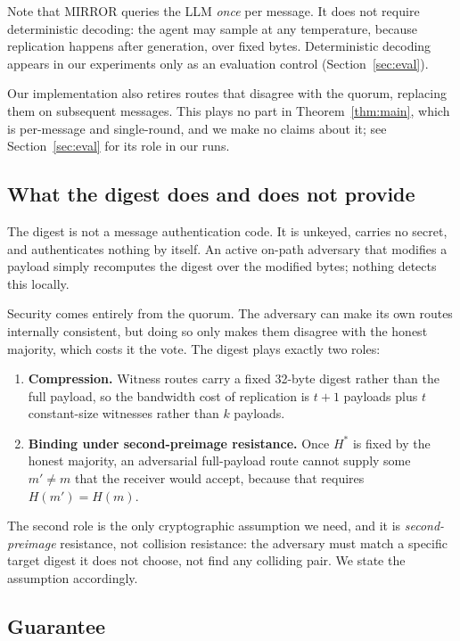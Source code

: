 \documentclass{article}
\begin{document}
Note that MIRROR queries the LLM \emph{once} per message. It does not require deterministic decoding: the agent may sample at any temperature, because replication happens after generation, over fixed bytes. Deterministic decoding appears in our experiments only as an evaluation control (Section~\ref{sec:eval}).

Our implementation also retires routes that disagree with the quorum, replacing them on subsequent messages. This plays no part in Theorem~\ref{thm:main}, which is per-message and single-round, and we make no claims about it; see Section~\ref{sec:eval} for its role in our runs.

\subsection{What the digest does and does not provide}
\label{sec:hash_scope}

The digest is not a message authentication code. It is unkeyed, carries no secret, and authenticates nothing by itself. An active on-path adversary that modifies a payload simply recomputes the digest over the modified bytes; nothing detects this locally.

Security comes entirely from the quorum. The adversary can make its own routes internally consistent, but doing so only makes them disagree with the honest majority, which costs it the vote. The digest plays exactly two roles:

\begin{enumerate}
    \item \textbf{Compression.} Witness routes carry a fixed 32-byte digest rather than the full payload, so the bandwidth cost of replication is $t+1$ payloads plus $t$ constant-size witnesses rather than $k$ payloads.
    \item \textbf{Binding under second-preimage resistance.} Once $H^\ast$ is fixed by the honest majority, an adversarial full-payload route cannot supply some $m' \neq m$ that the receiver would accept, because that requires $H(m') = H(m)$.
\end{enumerate}

The second role is the only cryptographic assumption we need, and it is \emph{second-preimage} resistance, not collision resistance: the adversary must match a specific target digest it does not choose, not find any colliding pair. We state the assumption accordingly.

\subsection{Guarantee}
\end{document}
